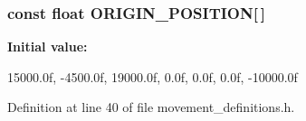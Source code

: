 \subsubsection[{\-O\-R\-I\-G\-I\-N\-\_\-\-P\-O\-S\-I\-T\-I\-O\-N}]{\setlength{\rightskip}{0pt plus 5cm}const float {\bf \-O\-R\-I\-G\-I\-N\-\_\-\-P\-O\-S\-I\-T\-I\-O\-N}[$\,$]}\label{movement__definitions_8h_a2ad0485bb435e29de38c196390aa2c8a}
{\bfseries \-Initial value\-:}
\begin{DoxyCode}
 {  15000.0f,
                                           -4500.0f,
                                           19000.0f,
                                               0.0f,
                                               0.0f,
                                               0.0f,
                                          -10000.0f }
\end{DoxyCode}


\-Definition at line 40 of file movement\-\_\-definitions.\-h.

